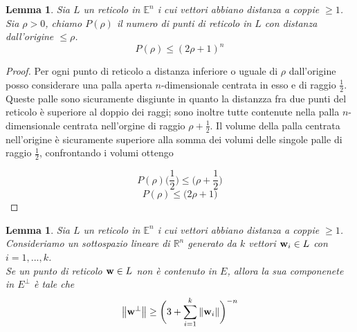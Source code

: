 \documentclass[12pt,a4paper]{book}
\newtheorem{lemma}[theorem]{Lemma}
\begin{document}
\begin{lemma}
Sia $L$ un reticolo in $\mathbb{E}^n$ i cui vettori abbiano distanza a coppie $\geq 1$. \\
Sia $\rho >0$, chiamo $P(\rho)$ il numero di punti di reticolo in $L$ con distanza dall'origine $\leq \rho$. 
\[ P(\rho) \leq (2 \rho +1)^n\]
\end{lemma}
\begin{proof}
Per ogni punto di reticolo a distanza inferiore o uguale di $\rho$ dall'origine posso considerare una palla aperta $n$-dimensionale centrata in esso e di raggio $\frac{1}{2}$. Queste palle sono sicuramente disgiunte in quanto la distanzza fra due punti del reticolo è superiore al doppio dei raggi; sono inoltre tutte contenute nella palla $n$-dimensionale centrata nell'orgine di raggio $ \rho + \frac{1}{2}$. 
Il volume della palla centrata nell'origine è sicuramente superiore alla somma dei volumi delle singole palle di raggio $\frac{1}{2}$, confrontando i volumi ottengo

\[ P(\rho) \bigg(  \frac{1}{2} \bigg) \leq \bigg( \rho + \frac{1}{2} \bigg) \]
\[ P(\rho) \leq \bigg( 2 \rho + 1 \bigg)\]
\end{proof}

\begin{lemma}
Sia $L$ un reticolo in $\mathbb{E}^n$ i cui vettori abbiano distanza a coppie $\geq 1$. \\ Consideriamo un sottospazio lineare di $\mathbb{R}^n$ generato da $k$ vettori $\vb{w}_i \in L$ con $i = 1,... ,k$. \\
Se un punto di reticolo $\vb{w} \in L$ non è contenuto in $E$, allora la sua componenete in $E^{\perp}$ è tale che 
\[ \norm{\vb{w}^{\perp}} \geq \bigg( 3 +  \sum_{i = 1}^{k} \norm{\vb{w}_i} \bigg)^{-n} \]
\end{lemma}
\end{document}
